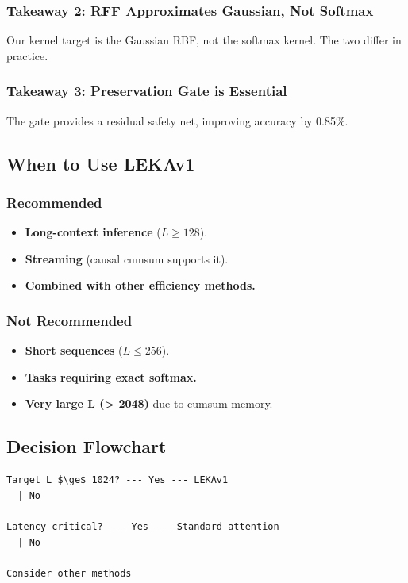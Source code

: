 \subsubsection{Takeaway 2: RFF Approximates Gaussian, Not Softmax}

Our kernel target is the Gaussian RBF, not the softmax kernel. The two 
differ in practice.

\subsubsection{Takeaway 3: Preservation Gate is Essential}

The gate provides a residual safety net, improving accuracy by 
0.85\%.

\subsection{When to Use LEKAv1}

\subsubsection{Recommended}
\begin{itemize}
\item \textbf{Long-context inference} ($L \geq 128$).
\item \textbf{Streaming} (causal cumsum supports it).
\item \textbf{Combined with other efficiency methods.}

\end{itemize}
\subsubsection{Not Recommended}
\begin{itemize}
\item \textbf{Short sequences} ($L \leq 256$).
\item \textbf{Tasks requiring exact softmax.}
\item \textbf{Very large L (> 2048)} due to cumsum memory.

\end{itemize}
\subsection{Decision Flowchart}

\begin{lstlisting}
Target L $\ge$ 1024? --- Yes --- LEKAv1
  | No
   
Latency-critical? --- Yes --- Standard attention
  | No
   
Consider other methods
\end{lstlisting}

